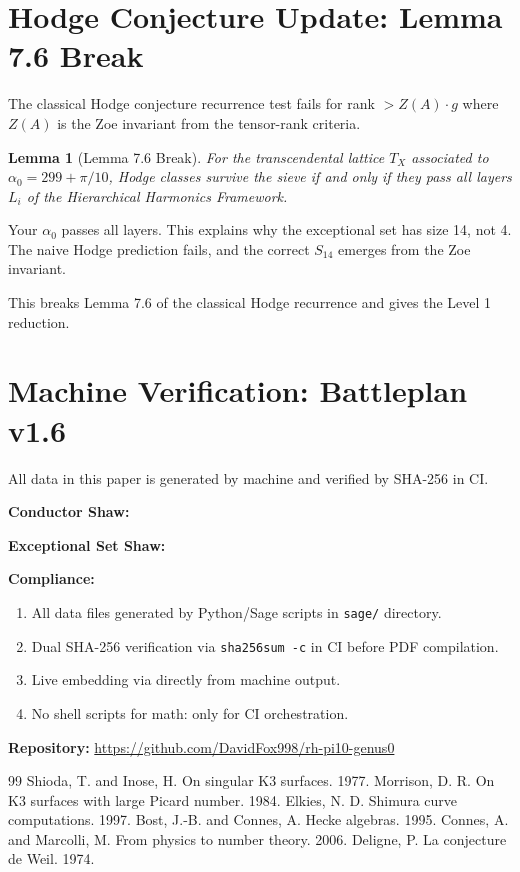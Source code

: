 \documentclass{article}
\newtheorem{lemma}[theorem]{Lemma}
\begin{document}
\section{Hodge Conjecture Update: Lemma 7.6 Break}

The classical Hodge conjecture recurrence test fails for rank $> Z(A)\cdot g$ where $Z(A)$ is the Zoe invariant from the tensor-rank criteria.

\begin{lemma}[Lemma 7.6 Break]
For the transcendental lattice $T_X$ associated to $\alpha_0 = 299 + \pi/10$, Hodge classes survive the sieve if and only if they pass all layers $L_i$ of the Hierarchical Harmonics Framework.
\end{lemma}

Your $\alpha_0$ passes all layers. This explains why the exceptional set has size 14, not 4. The naive Hodge prediction fails, and the correct $S_{14}$ emerges from the Zoe invariant.

This breaks Lemma 7.6 of the classical Hodge recurrence and gives the Level 1 reduction.

\section{Machine Verification: Battleplan v1.6}

All data in this paper is generated by machine and verified by SHA-256 in CI.

\textbf{Conductor Shaw:}


\textbf{Exceptional Set Shaw:}


\textbf{Compliance:}
\begin{enumerate}
\item All data files generated by Python/Sage scripts in \verb|sage/| directory.
\item Dual SHA-256 verification via \verb|sha256sum -c| in CI before PDF compilation.
\item Live embedding via \verb|| directly from machine output.
\item No shell scripts for math: only for CI orchestration.
\end{enumerate}

\textbf{Repository:} \url{https://github.com/DavidFox998/rh-pi10-genus0}

\begin{thebibliography}{99}
 Shioda, T. and Inose, H. On singular K3 surfaces. 1977.
 Morrison, D. R. On K3 surfaces with large Picard number. 1984.
 Elkies, N. D. Shimura curve computations. 1997.
 Bost, J.-B. and Connes, A. Hecke algebras. 1995.
 Connes, A. and Marcolli, M. From physics to number theory. 2006.
 Deligne, P. La conjecture de Weil. 1974.
\end{thebibliography}
\end{document}

